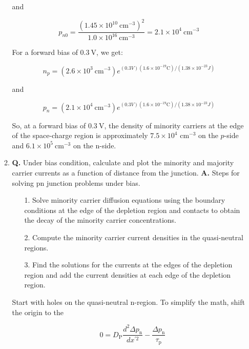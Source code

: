 \documentclass[main.tex]{subfiles}
\begin{document}
\begin{enumerate}
\begin{enumerate}
        and
        
        $$
        p_{n 0}=\frac{\left(1.45 \times 10^{10} \mathrm{~cm}^{-3}\right)^2}{1.0 \times 10^{16} \mathrm{~cm}^{-3}}=2.1 \times 10^4 \mathrm{~cm}^{-3}
        $$
        
        For a forward bias of $0.3 \mathrm{~V}$, we get:
        
        $$
        n_p=\left(2.6 \times 10^3 \mathrm{~cm}^{-3}\right) e^{(0.3 V)\left(1.6 \times 10^{-19} \mathrm{C}\right) /\left(1.38 \times 10^{-23} J\right)}
        $$
        
        and
        
        $$
        p_n=\left(2.1 \times 10^4 \mathrm{~cm}^{-3}\right) e^{(0.3 V)\left(1.6 \times 10^{-19} \mathrm{C}\right) /\left(1.38 \times 10^{-23} J\right)}
        $$
        
        So, at a forward bias of $0.3 \mathrm{~V}$, the density of minority carriers at the edge of the space-charge region is approximately $7.5 \times 10^{4}$ $\mathrm{cm}^{-3}$ on the $p$-side and $6.1 \times 10^{5} \mathrm{~cm}^{-3}$ on the n-side.
        
        \item \textbf{Q.} Under bias condition, calculate and plot the minority and majority carrier currents as a function of distance from the junction. \textbf{A.} Steps for solving pn junction problems under bias.
        
        \begin{itemize}
            \item[1.] Solve minority carrier diffusion equations using the boundary conditions at the edge of the depletion region and contacts to obtain the decay of the minority carrier concentrations.
            \item[2.] Compute the minority carrier current densities in the quasi-neutral regions.
            \item[3.] Find the solutions for the currents at the edges of the depletion region and add the current densities at each edge of the depletion region.
        \end{itemize}
        
        Start with holes on the quasi-neutral n-region. To simplify the math, shift the origin to the 
        
        $$
        \quad 0=D_{\mathrm{P}} \frac{d^2 \Delta p_{\mathrm{n}}}{d x^{\prime 2}}-\frac{\Delta p_{\mathrm{n}}}{\tau_{\mathrm{p}}}
        $$ 
        

\end{enumerate}
\end{enumerate}
\end{document}
